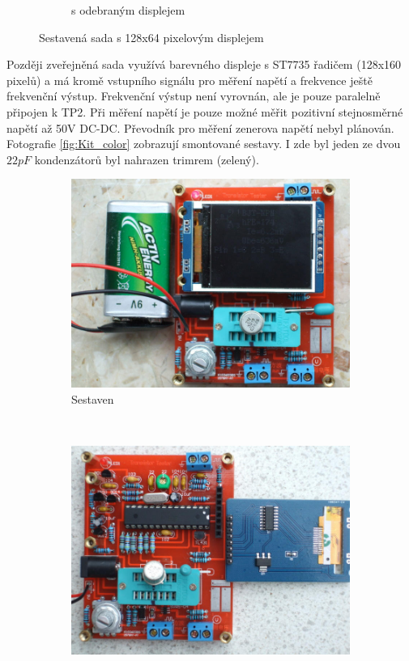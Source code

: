 \begin{figure}[H]
\begin{subfigure}[b]{.5\textwidth}
    \caption{s odebraným displejem}
  \end{subfigure}
  \caption{Sestavená sada s 128x64 pixelovým displejem}
  \label{fig:Kit_mono}
\end{figure}

Později zveřejněná sada využívá barevného displeje s ST7735 řadičem (128x160 pixelů) a má kromě
vstupního signálu pro měření napětí a frekvence ještě frekvenční výstup.
Frekvenční výstup není vyrovnán, ale je pouze paralelně připojen k TP2.
Při měření napětí je pouze možné měřit pozitivní stejnosměrné napětí až 50V DC-DC.
Převodník pro měření zenerova napětí nebyl plánován.
Fotografie \ref{fig:Kit_color} zobrazují smontované sestavy.
I zde byl jeden ze dvou \(22 pF\) kondenzátorů byl nahrazen trimrem (zelený). 

\begin{figure}[H]
  \begin{subfigure}[b]{.5\textwidth}
    \centering
    \includegraphics[width=1.\textwidth]{../PNG/Kit_Color_a.jpg}
    \caption{Sestaven}
  \end{subfigure}
  ~
  \begin{subfigure}[b]{.5\textwidth}
    \centering
    \includegraphics[width=1.\textwidth]{../PNG/Kit_Color_b.jpg}

\end{subfigure}
\end{figure}
